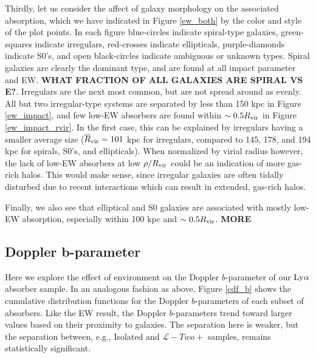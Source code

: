 \documentclass[twocolumn,tighten]{aastex62}
\begin{document}
Thirdly, let us consider the affect of galaxy morphology on the associated absorption, which we have indicated in Figure \ref{ew_both} by the color and style of the plot points. In each figure blue-circles indicate spiral-type galaxies, green-squares indicate irregulars, red-crosses indicate ellipticals, purple-diamonds indicate S0's, and open black-circles indicate ambiguous or unknown types. Spiral galaxies are clearly the dominant type, and are found at all impact parameter and EW. \textbf{WHAT FRACTION OF ALL GALAXIES ARE SPIRAL VS E?}. Irregulars are the next most common, but are not spread around as evenly. All but two irregular-type systems are separated by less than 150 kpc in Figure \ref{ew_impact}, and few low-EW absorbers are found within $\sim 0.5 R_{\rm vir}$ in Figure \ref{ew_impact_rvir}. In the first case, this can be explained by irregulars having a smaller average size ($\overline{R}_{\rm vir} = 101$ kpc for irregulars, compared to 145, 178, and 194 kpc for spirals, S0's, and ellipticals). When normalized by virial radius however, the lack of low-EW absorbers at low $\rho / R_{\rm vir}$ could be an indication of more gas-rich halos. This would make sense, since irregular galaxies are often tidally disturbed due to recent interactions which can result in extended, gas-rich halos.

Finally, we also see that elliptical and S0 galaxies are associated with mostly low-EW absorption, especially within 100 kpc and $\sim 0.5 R_{\rm vir}$. \textbf{MORE}



\subsection{Doppler b-parameter}

Here we explore the effect of environment on the Doppler $b$-parameter of our $\rm Ly\alpha$ absorber sample. In an analogous fashion as above, Figure \ref{cdf_b} shows the cumulative distribution functions for the Doppler $b$-parameters of each subset of absorbers. Like the EW result, the Doppler $b$-parameters trend toward larger values based on their proximity to galaxies. The separation here is weaker, but the separation between, e.g., Isolated and $\mathcal{L}-Two+$ samples, remains statistically significant.
\end{document}
